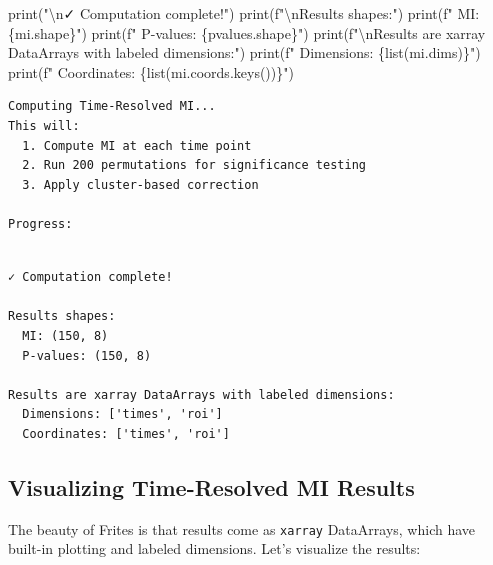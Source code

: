 \documentclass[
  11pt,
  letterpaper,
  oneside,
  openany]{book}
\newenvironment{Shaded}{\begin{snugshade}}{\end{snugshade}}
\newcommand{\BuiltInTok}[1]{\textcolor[rgb]{0.00,0.23,0.31}{#1}}
\newcommand{\CharTok}[1]{\textcolor[rgb]{0.13,0.47,0.30}{#1}}
\newcommand{\NormalTok}[1]{\textcolor[rgb]{0.00,0.23,0.31}{#1}}
\newcommand{\SpecialCharTok}[1]{\textcolor[rgb]{0.37,0.37,0.37}{#1}}
\newcommand{\SpecialStringTok}[1]{\textcolor[rgb]{0.13,0.47,0.30}{#1}}
\newcommand{\StringTok}[1]{\textcolor[rgb]{0.13,0.47,0.30}{#1}}
\begin{document}
\begin{Shaded}
\begin{Highlighting}[]
\BuiltInTok{print}\NormalTok{(}\StringTok{"}\CharTok{\textbackslash{}n}\StringTok{✓ Computation complete!"}\NormalTok{)}
\BuiltInTok{print}\NormalTok{(}\SpecialStringTok{f"}\CharTok{\textbackslash{}n}\SpecialStringTok{Results shapes:"}\NormalTok{)}
\BuiltInTok{print}\NormalTok{(}\SpecialStringTok{f"  MI: }\SpecialCharTok{\{}\NormalTok{mi}\SpecialCharTok{.}\NormalTok{shape}\SpecialCharTok{\}}\SpecialStringTok{"}\NormalTok{)}
\BuiltInTok{print}\NormalTok{(}\SpecialStringTok{f"  P{-}values: }\SpecialCharTok{\{}\NormalTok{pvalues}\SpecialCharTok{.}\NormalTok{shape}\SpecialCharTok{\}}\SpecialStringTok{"}\NormalTok{)}
\BuiltInTok{print}\NormalTok{(}\SpecialStringTok{f"}\CharTok{\textbackslash{}n}\SpecialStringTok{Results are xarray DataArrays with labeled dimensions:"}\NormalTok{)}
\BuiltInTok{print}\NormalTok{(}\SpecialStringTok{f"  Dimensions: }\SpecialCharTok{\{}\BuiltInTok{list}\NormalTok{(mi.dims)}\SpecialCharTok{\}}\SpecialStringTok{"}\NormalTok{)}
\BuiltInTok{print}\NormalTok{(}\SpecialStringTok{f"  Coordinates: }\SpecialCharTok{\{}\BuiltInTok{list}\NormalTok{(mi.coords.keys())}\SpecialCharTok{\}}\SpecialStringTok{"}\NormalTok{)}
\end{Highlighting}
\end{Shaded}

\begin{verbatim}
Computing Time-Resolved MI...
This will:
  1. Compute MI at each time point
  2. Run 200 permutations for significance testing
  3. Apply cluster-based correction

Progress:
\end{verbatim}

\begin{verbatim}

✓ Computation complete!

Results shapes:
  MI: (150, 8)
  P-values: (150, 8)

Results are xarray DataArrays with labeled dimensions:
  Dimensions: ['times', 'roi']
  Coordinates: ['times', 'roi']
\end{verbatim}

\subsection{Visualizing Time-Resolved MI
Results}\label{visualizing-time-resolved-mi-results}

The beauty of Frites is that results come as \texttt{xarray} DataArrays,
which have built-in plotting and labeled dimensions. Let's visualize the
results:
\end{document}
